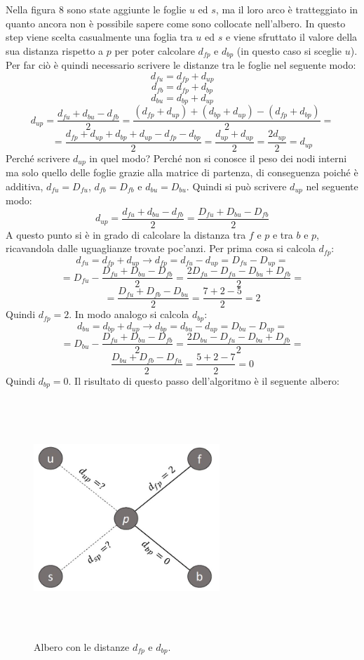 \newline
Nella figura 8 sono state aggiunte le foglie $u$ ed $s$, ma il loro arco è tratteggiato in quanto ancora non è possibile sapere come sono collocate nell'albero.
\newline
In questo step viene scelta casualmente una foglia tra $u$ ed $s$ e viene sfruttato il valore della sua distanza rispetto a $p$ per poter calcolare $d_{fp}$ e $d_{bp}$ (in questo caso si sceglie $u$). Per far ciò è quindi necessario scrivere le distanze tra le foglie nel seguente modo:
\[d_{fu}=d_{fp}+d_{up}\]
\[d_{fb}=d_{fp}+d_{bp}\]
\[d_{bu}=d_{bp}+d_{up}\]
\[d_{up}=\frac{d_{fu}+d_{bu}-d_{fb}}2=
\frac{(d_{fp}+d_{up})+(d_{bp}+d_{up})-(d_{fp}+d_{bp})}2=\]
\[=\frac{d_{fp}+d_{up}+d_{bp}+d_{up}-d_{fp}-d_{bp}}2=
\frac{d_{up}+d_{up}}2=
\frac{2d_{up}}2=d_{up}
\]
Perché scrivere $d_{up}$ in quel modo? Perché non si conosce il peso dei nodi interni ma solo quello delle foglie grazie alla matrice di partenza, di conseguenza poiché è additiva, $d_{fu}=D_{fu}$, $d_{fb}=D_{fb}$ e $d_{bu}=D_{bu}$. Quindi si può scrivere $d_{up}$ nel seguente modo:
\[d_{up}=\frac{d_{fu}+d_{bu}-d_{fb}}2=\frac{D_{fu}+D_{bu}-D_{fb}}2\]
A questo punto si è in grado di calcolare la distanza tra $f$ e $p$ e tra $b$ e $p$, ricavandola dalle uguaglianze trovate poc'anzi. Per prima cosa si calcola $d_{fp}$:
\[d_{fu}=d_{fp}+d_{up} \rightarrow d_{fp}=d_{fu}-d_{up}=D_{fu}-D_{up}=\]
\[=D_{fu}-\frac{D_{fu}+D_{bu}-D_{fb}}2=\frac{2D_{fu}-D_{fu}-D_{bu}+D_{fb}}2=\]
\[=\frac{D_{fu}+D_{fb}-D_{bu}}2=\frac{7+2-5}2=2\]
Quindi $d_{fp}=2$. In modo analogo si calcola $d_{bp}$:
\[d_{bu}=d_{bp}+d_{up} \rightarrow d_{bp}=d_{bu}-d_{up}=D_{bu}-D_{up}=\]
\[=D_{bu}-\frac{D_{fu}+D_{bu}-D_{fb}}2=\frac{2D_{bu}-D_{fu}-D_{bu}+D_{fb}}2=\]
\[\frac{D_{bu}+D_{fb}-D_{fu}}2=\frac{5+2-7}2=0\]
Quindi $d_{bp}=0$. Il risultato di questo passo dell'algoritmo è il seguente albero:
\begin{figure}[h!]
\centering
	\includegraphics[height=9cm, width=7cm, keepaspectratio]{distance_between_f_b_part_3.jpg}
 	\caption{Albero con le distanze $d_{fp}$ e $d_{bp}$.}
  	\label{fig:neighborsleaves_3}
\end{figure}
